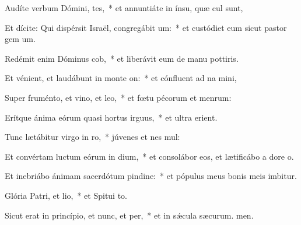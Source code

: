 \item Audíte verbum Dómini, tes,~* et annuntiáte in ínsu, quæ cul sunt,
\item Et dícite: Qui dispérsit Israël, congregábit um:~* et custódiet eum sicut pastor gem um.
\item Redémit enim Dóminus cob,~* et liberávit eum de manu pottiris.
\item Et vénient, et laudábunt in monte on:~* et cónfluent ad na mini,
\item Super fruménto, et vino, et leo,~* et fœtu pécorum et menrum:
\item Erítque ánima eórum quasi hortus irguus,~* et ultra  erient.
\item Tunc lætábitur virgo in ro,~* júvenes et nes mul:
\item Et convértam luctum eórum in dium,~* et consolábor eos, et lætificábo a dore o.
\item Et inebriábo ánimam sacerdótum pindine:~* et pópulus meus bonis meis imbitur.
\item Glória Patri, et lio,~* et Spitui to.
\item Sicut erat in princípio, et nunc, et per,~* et in sǽcula sæcurum. men.
